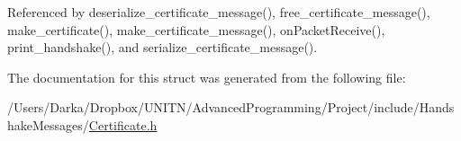 Referenced by deserialize\+\_\+certificate\+\_\+message(), free\+\_\+certificate\+\_\+message(), make\+\_\+certificate(), make\+\_\+certificate\+\_\+message(), on\+Packet\+Receive(), print\+\_\+handshake(), and serialize\+\_\+certificate\+\_\+message().



The documentation for this struct was generated from the following file\+:\begin{DoxyCompactItemize}
\item 
/\+Users/\+Darka/\+Dropbox/\+U\+N\+I\+T\+N/\+Advanced\+Programming/\+Project/include/\+Handshake\+Messages/\hyperlink{_certificate_8h}{Certificate.\+h}\end{DoxyCompactItemize}
